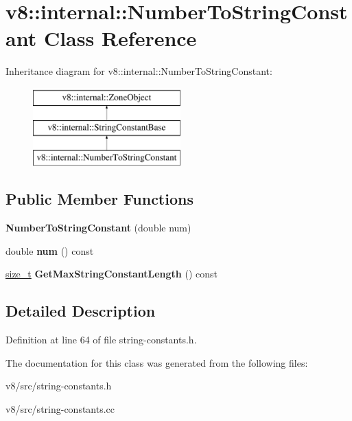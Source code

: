 \hypertarget{classv8_1_1internal_1_1NumberToStringConstant}{}\section{v8\+:\+:internal\+:\+:Number\+To\+String\+Constant Class Reference}
\label{classv8_1_1internal_1_1NumberToStringConstant}
Inheritance diagram for v8\+:\+:internal\+:\+:Number\+To\+String\+Constant\+:\begin{figure}[H]
\begin{center}
\leavevmode
\includegraphics[height=3.000000cm]{classv8_1_1internal_1_1NumberToStringConstant}
\end{center}
\end{figure}
\subsection*{Public Member Functions}
\begin{DoxyCompactItemize}
\item 
\mbox{\label{classv8_1_1internal_1_1NumberToStringConstant_a1e4b9d1732b116d647dac67b29ea86b7}} 
{\bfseries Number\+To\+String\+Constant} (double num)
\item 
\mbox{\label{classv8_1_1internal_1_1NumberToStringConstant_abbb0e3d22e28bc2948bdc80f0975d91e}} 
double {\bfseries num} () const
\item 
\mbox{\label{classv8_1_1internal_1_1NumberToStringConstant_a6349764ae6b395892f318a88937e4908}} 
\mbox{\hyperlink{classsize__t}{size\+\_\+t}} {\bfseries Get\+Max\+String\+Constant\+Length} () const
\end{DoxyCompactItemize}


\subsection{Detailed Description}


Definition at line 64 of file string-\/constants.\+h.



The documentation for this class was generated from the following files\+:\begin{DoxyCompactItemize}
\item 
v8/src/string-\/constants.\+h\item 
v8/src/string-\/constants.\+cc\end{DoxyCompactItemize}
